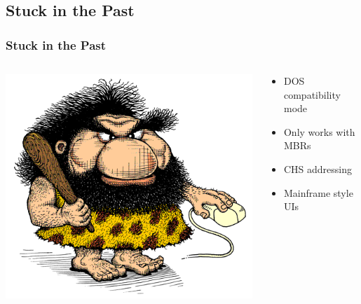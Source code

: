 \documentclass{beamer}
\begin{document}
\subsection{Stuck in the Past}
\begin{frame}\frametitle{Stuck in the Past}
  \begin{columns}
    \begin{column}{.5\linewidth}
      \includegraphics[scale=0.3]{img/linkman}
       \end{column}
    \begin{column}{.5\linewidth}
      \begin{itemize}
      \item DOS compatibility mode
      \item Only works with MBRs
      \item CHS addressing
      \item Mainframe style UIs\newline
      \end{itemize}
    \end{column}
  \end{columns}
\end{frame}
\end{document}
